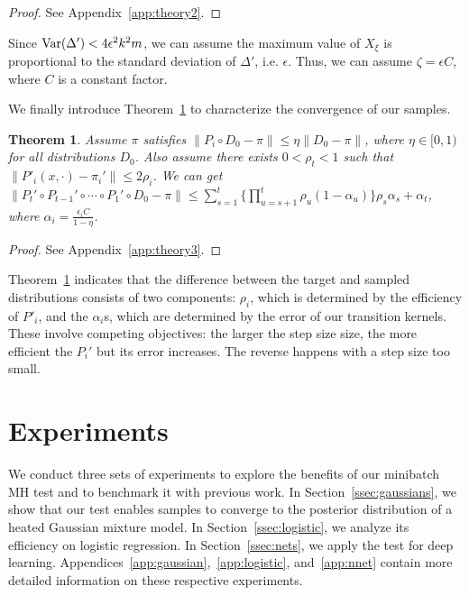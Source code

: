 \documentclass{article}
\newtheorem{theorem}{Theorem}
\begin{document}
\begin{proof}
See Appendix~\ref{app:theory2}.
\end{proof}

Since ${\rm Var}(\Delta') < 4\epsilon^2 k^2 m $, we can assume the maximum value of $X_{\xi}$ is
proportional to the standard deviation of $\Delta'$, i.e. $\epsilon$. Thus, we can assume
$\zeta=\epsilon C$, where $C$ is a constant factor.

We finally introduce Theorem~\ref{thm:theory3} to characterize the convergence of our samples.

\begin{theorem}\label{thm:theory3}
Assume $\pi$ satisfies $\|P_i \circ D_0 - \pi\| \leq \eta \|D_0 - \pi\|$, where $\eta \in [0, 1)$ for
all distributions $D_0$. Also assume there exists $0 < \rho_t < 1$ such that $\|P'_i(x, \cdot) -
\pi_i'\| \leq 2\rho_i$. We can get $\| P_t' \circ P_{t-1}' \circ \cdots \circ P_1' \circ D_0 - \pi
\| \leq \sum_{s=1}^t \{\prod _{u=s+1}^t \rho_u (1-\alpha_u)\} \rho_s \alpha_s + \alpha_t $, where
$\alpha_i = \frac{\epsilon_i C }{1-\eta}$.
\end{theorem}

\begin{proof}
See Appendix~\ref{app:theory3}.
\end{proof}

Theorem~\ref{thm:theory3} indicates that the difference between the target and sampled distributions
consists of two components: $\rho_i$, which is determined by the efficiency of $P'_i$, and the
$\alpha_i$s, which are determined by the error of our transition kernels. These involve competing
objectives: the larger the step size size, the more efficient the $P_i'$ but its error increases.
The reverse happens with a step size too small.




\section{Experiments}\label{sec:experiments}

We conduct three sets of experiments to explore the benefits of our minibatch MH test and to
benchmark it with previous work. In Section~\ref{ssec:gaussians}, we show that our test enables
samples to converge to the posterior distribution of a heated Gaussian mixture model. In
Section~\ref{ssec:logistic}, we analyze its efficiency on logistic regression. In
Section~\ref{ssec:nets}, we apply the test for deep learning.
Appendices~\ref{app:gaussian},~\ref{app:logistic}, and~\ref{app:nnet} contain more detailed
information on these respective experiments.
\end{document}
